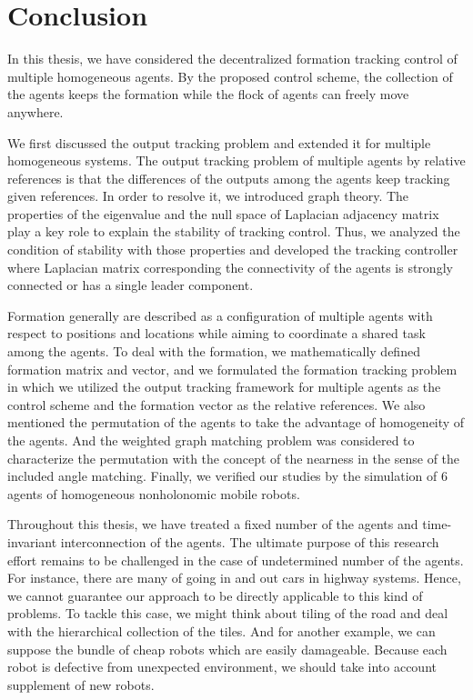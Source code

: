 \documentclass[11pt, a4paper, oneside, openany, reqno]{book}
\theoremstyle{definition}
\theoremstyle{remark}
\numberwithin{equation}{chapter} %
\begin{document}
\chapter{Conclusion}
In this thesis, 
we have considered the decentralized formation tracking control of multiple homogeneous agents.
By the proposed control scheme, the collection of the agents keeps the formation
while the flock of agents can freely move anywhere.

We first discussed the output tracking problem and extended it for multiple homogeneous systems.
The output tracking problem of multiple agents by relative references is that
the differences of the outputs among the agents keep tracking given references.
In order to resolve it, we introduced graph theory.
The properties of the eigenvalue and the null space of Laplacian adjacency matrix 
play a key role to explain the stability of tracking control.
Thus, we analyzed the condition of stability with those properties and developed the tracking controller 
where Laplacian matrix corresponding the connectivity of the agents is strongly connected or
has a single leader component.

Formation generally are described as a configuration of multiple agents with respect to
positions and locations while aiming to coordinate a shared task among the agents.
To deal with the formation, we mathematically defined formation matrix and vector, 
and we formulated the formation tracking problem in which 
we utilized the output tracking framework for multiple agents as the control scheme
and the formation vector as the relative references.
We also mentioned the permutation of the agents to take the advantage of homogeneity of the agents.
And the weighted graph matching problem was considered to characterize the permutation
with the concept of the nearness in the sense of the included angle matching.
Finally, we verified our studies by the simulation of $ 6 $ agents of homogeneous nonholonomic mobile robots.

Throughout this thesis, we have treated a fixed number of the agents and 
time-invariant interconnection of the agents. 
The ultimate purpose of this research effort remains to be challenged 
in the case of undetermined number of the agents.
For instance, there are many of going in and out cars in highway systems.
Hence, we cannot guarantee our approach to be directly applicable to this kind of problems.
To tackle this case, we might think about tiling of the road and 
deal with the hierarchical collection of the tiles.
And for another example, we can suppose the bundle of cheap robots which are easily damageable.
Because each robot is defective from unexpected environment, 
we should take into account supplement of new robots. 
\end{document}
